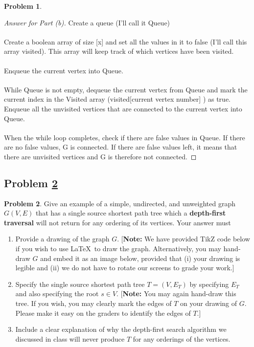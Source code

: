 \documentclass[11pt]{article}
\theoremstyle{definition}
\theoremstyle{definition}
\newtheorem{required}{Problem}
\theoremstyle{definition}
\begin{document}
\begin{required}
\begin{enumerate}[label=(\alph*)]
\begin{proof}[Answer for Part (b)]

Create a queue (I'll call it Queue)
\\ \\
Create a boolean array of size [x] and set all the values in it to false (I'll call this array visited). This array will keep track of which vertices have been visited.
\\ \\
Enqueue the current vertex into Queue.
\\  \\
While Queue is not empty, dequeue the current vertex from Queue and mark the current index in the Visited array (visited[current vertex number] ) as true. Enqueue all the unvisited vertices that are connected to the current vertex into Queue.
\\ \\
When the while loop completes, check if there are false values in Queue. If there are no false values, G is connected. If there are false values left, it means that there are unvisited vertices and G is therefore not connected.

\end{proof}
\end{enumerate}
\end{required}





\newpage
\subsection{Problem \ref{DFS2}} 
\begin{required} \label{DFS2}
Give an example of a simple, undirected, and unweighted graph $G(V, E)$ that has a single source shortest path tree which a \textbf{depth-first traversal} will not return for any ordering of its vertices. 
    Your answer must
    \begin{enumerate}[label=(\alph*)]
    	\item Provide a drawing of the graph $G$. [\textbf{Note:} We have provided TikZ code below if you wish to use \LaTeX \ to draw the graph. Alternatively, you may hand-draw $G$ and embed it as an image below, provided that (i) your drawing is legible and (ii) we do not have to rotate our screens to grade your work.]
    	\item Specify the single source shortest path tree $T = (V,E_T)$ by specifying $E_T$ and also specifying the root $s \in V$. [\textbf{Note:} You may again hand-draw this tree. If you wish, you may clearly mark the edges of $T$ on your drawing of $G$. Please make it easy on the graders to identify the edges of $T$.] 
    	\item Include a clear explanation of why the depth-first search algorithm we discussed in class will never produce $T$ for any orderings of the vertices.
    \end{enumerate}

\end{required}
\end{document}
